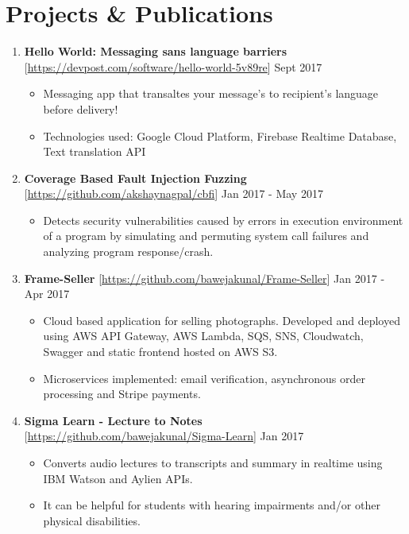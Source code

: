 \documentclass{article}
\newcommand{\bi}{\vspace{-1mm}\begin{itemize}[align=left,leftmargin=*, rightmargin=80pt, labelindent=0pt,labelsep=2pt, label={-}, nosep]}
\newcommand{\ei}{\end{itemize}}
\begin{document}
\section*{Projects \& Publications}
\begin{enumerate}

    \item \textbf{Hello World: Messaging sans language barriers} [\href{https://devpost.com/software/hello-world-5v89re}{https://devpost.com/software/hello-world-5v89re}] {\hfill Sept 2017}
    \bi
        \item Messaging app that transaltes your message's to recipient's language before delivery!
        \item Technologies used: Google Cloud Platform, Firebase Realtime Database, Text translation API
    \ei

    \item \textbf{Coverage Based Fault Injection Fuzzing} [\href{https://github.com/akshaynagpal/cbfi}{https://github.com/akshaynagpal/cbfi}] {\hfill Jan 2017 - May 2017}
    \bi
        \item Detects security vulnerabilities caused by errors in execution environment of a program by simulating and permuting system call failures and analyzing program response/crash.
    \ei

    \item \textbf{Frame-Seller} [\href{https://github.com/bawejakunal/Frame-Seller}{https://github.com/bawejakunal/Frame-Seller}] {\hfill Jan 2017 - Apr 2017}
    \bi
        \item Cloud based application for selling photographs. Developed and deployed using AWS API Gateway, AWS Lambda, SQS, SNS, Cloudwatch, Swagger and static frontend hosted on AWS S3.

        \item Microservices implemented: email verification, asynchronous order processing and Stripe payments.
    \ei

    \item \textbf{Sigma Learn - Lecture to Notes} [\href{https://github.com/bawejakunal/Sigma-Learn}{https://github.com/bawejakunal/Sigma-Learn}] {\hfill Jan 2017}
    \bi
        \item Converts audio lectures to transcripts and summary in realtime using IBM Watson and Aylien APIs.
        
        \item It can be helpful for students with hearing impairments and/or other physical disabilities.
    \ei


\end{enumerate}
\end{document}
